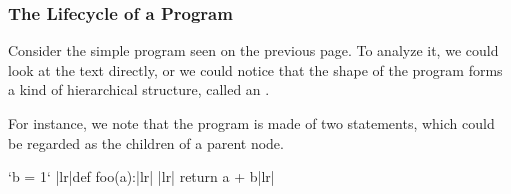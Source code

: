 \documentclass[aspectratio=169, handout]{beamer}
\begin{document}
\begin{frame}[fragile]
  \frametitle{The Lifecycle of a Program}

  Consider the simple program seen on the previous page. To analyze it, we could
  look at the text directly, or we could notice that the shape of the program forms
  a kind of hierarchical structure, called an .

  \pause
  \vspace{5pt}

  For instance, we note that the program is made of two statements, which could be
  regarded as the children of a parent node.

  \vspace{8pt}

  \begin{minipage}[t][1in][t]{\textwidth}
    \begin{minipage}{0.3\textwidth}
      \begin{pythoncodeblock}
        `b = 1`
        |lr|def foo(a):|lr|
        |lr|  return a + b|lr|
      \end{pythoncodeblock}
    \end{minipage}
    \begin{minipage}{0.65\textwidth}
      \begin{center}
    \end{center}
    \end{minipage}
  \end{minipage}

  \pause
  \vspace{8pt}

\end{frame}
\end{document}
